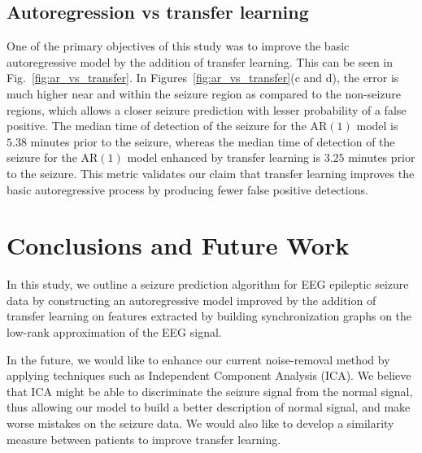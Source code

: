 \documentclass{article} %
\theoremstyle{definition}
\theoremstyle{remark}
\newcommand{\BibDir}{./bibliography}
\begin{document}
\subsection{Autoregression vs transfer learning}
One of the primary objectives of this study was to improve the basic autoregressive model by the addition of transfer learning.  This can be seen in Fig.~\ref{fig:ar_vs_transfer}.  In Figures~\ref{fig:ar_vs_transfer}(c and d), the error is much higher near and within the seizure region as compared to the non-seizure regions, which allows a closer seizure prediction with lesser probability of a false positive.  The median time of detection of the seizure for the AR$(1)$ model is $5.38$ minutes prior to the seizure, whereas the median time of detection of the seizure for the AR$(1)$ model enhanced by transfer learning is $3.25$ minutes prior to the seizure.  This metric validates our claim that transfer learning improves the basic autoregressive process by producing fewer false positive detections.

\section{Conclusions and Future Work} \label{sec:discuss}
In this study, we outline a seizure prediction algorithm for EEG epileptic seizure data by constructing an autoregressive model improved by the addition of transfer learning on features extracted by building synchronization graphs on the low-rank approximation of the EEG signal.  

In the future, we would like to enhance our current noise-removal method by applying techniques such as Independent Component Analysis (ICA).  We believe that ICA might be able to discriminate the seizure signal from the normal signal, thus allowing our model to build a better description of normal signal, and make worse mistakes on the seizure data.  We would also like to develop a similarity measure between patients to improve transfer learning.


{\small


}
\end{document}
